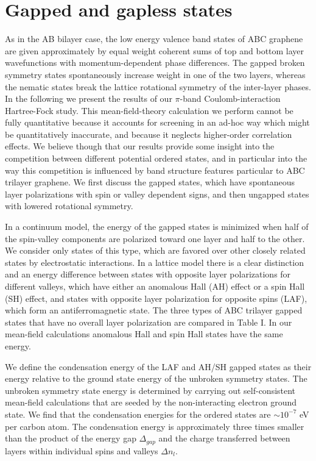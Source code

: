 \documentclass[twocolumn,prb,showpacs,preprintnumbers,amsmath,amssymb]{revtex4}
\begin{document}
\section{Gapped and gapless states} 
As in the AB bilayer case, the low energy valence band states of ABC graphene are 
given approximately by equal weight coherent sums of top and bottom layer 
wavefunctions with momentum-dependent phase differences.  
The gapped broken symmetry states spontaneously increase weight in one of the 
two layers, whereas\cite{nobelsymposium} the nematic states break the lattice rotational symmetry of the inter-layer 
phases.  In the following we present  the results of our $\pi$-band Coulomb-interaction 
Hartree-Fock study.  This mean-field-theory calculation we perform cannot be fully quantitative
because it accounts for screening in an ad-hoc way which might be quantitatively inaccurate,
and because it neglects higher-order correlation effects.  We believe though that our 
results provide some insight into the competition between different potential 
ordered states, and in particular into the way this competition is influenced by 
band structure features particular to ABC trilayer graphene.  We first discuss the gapped states,
which have spontaneous layer polarizations with spin or valley dependent signs, and then 
ungapped states with lowered rotational symmetry.    

In a continuum model, the energy of the gapped states is minimized when half of the
spin-valley components are polarized toward one layer and half to the other. \cite{jeilbilayer,fan}
We consider only states of this type, which are favored over other closely related states 
by electrostatic interactions.  
In a lattice model there is a clear distinction and an energy difference
between states with opposite layer polarizations
for different valleys, which have either an anomalous Hall (AH) effect or a spin Hall (SH)
effect, and states with opposite layer 
polarization for opposite spins (LAF), which form an antiferromagnetic state.  
The three types of ABC trilayer gapped states that have no overall layer polarization are
compared in Table I.  In our mean-field calculations anomalous Hall and spin Hall states 
have the same energy.

We define the condensation energy of the LAF and AH/SH gapped states 
as their energy relative to the ground state energy of the 
unbroken symmetry states.  
The unbroken symmetry state energy is determined by 
carrying out self-consistent mean-field calculations that are 
seeded by the non-interacting electron ground state.
We find that the condensation energies for the 
ordered states are $\sim 10^{-7}$ eV per carbon atom.
The condensation energy is approximately three times smaller than the 
product of the energy gap $\Delta_{gap}$ and the 
charge transferred between layers within individual spins and valleys $\Delta n_l$. 
\end{document}
